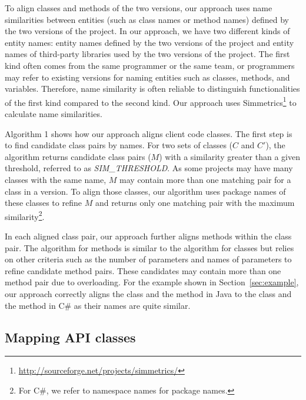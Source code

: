 To align classes and methods of the two versions, our approach uses
name similarities between entities (such as class names or method names)
defined by the two versions of the project. In our approach, we have two
different kinds of entity names: entity names defined by the two versions
of the project and entity names of third-party libraries used by the two versions of the project.
The first kind often comes from the same programmer or the same team, or
programmers may refer to existing versions for naming entities such
as classes, methods, and variables. Therefore, name similarity is often
reliable to distinguish functionalities of the first kind compared to the second
kind. Our approach uses Simmetrics\footnote{\url{http://sourceforge.net/projects/simmetrics/}}
to calculate name similarities.

Algorithm 1 shows how our approach aligns client code classes. The
first step is to find candidate class pairs by names. For two sets
of classes ($C$ and $C'$), the algorithm returns candidate class
pairs ($M$) with a similarity greater than a given threshold,
referred to as \emph{SIM\_THRESHOLD}. As some projects may have many
classes with the same name, $M$ may contain more than one matching
pair for a class in a version. To align those classes, our algorithm
uses package names of these classes to refine $M$ and returns only
one matching pair with the maximum similarity\footnote{For C\#, we
refer to namespace names for package names.}.

In each aligned class pair, our approach further aligns methods
within the class pair. The algorithm for methods is similar to the
algorithm for classes but relies on other criteria such as the number of parameters
and names of parameters to refine candidate method pairs. These candidates
may contain more than one method pair due to overloading.
For the example shown in Section~\ref{sec:example}, our approach
correctly aligns the class  and the method
 in Java to the class 
and the method  in C\# as their names are quite
similar.
\subsection{Mapping API classes}
\label{sec:approach:mappingtypes}

